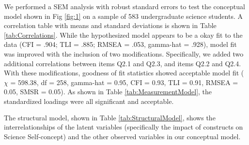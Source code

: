 \documentclass[smallextended]{svjour3}       %
\begin{document}
We performed a SEM analysis with robust standard errors to test the conceptual model shown in Fig \ref{fig:1} on a sample of 583 undergraduate science students. A correlation table with means and standard deviations is shown in Table \ref{tab:Correlations}. While the hypothesized model appears to be a okay fit to the data (CFI = .904; TLI = .885;  RMSEA = .053, gamma-hat =  .928), model fit was improved with the inclusion of two modifications. Specifically, we added two additional correlations between items Q2.1 and Q2.3, and items Q2.2 and Q2.4. With these modifications, goodness of fit statistics showed acceptable model fit \cite{hu1999cutoff,steiger2007understanding} ($\chi$ = 598.38, df = 258, gamma-hat = 0.95, CFI = 0.93, TLI = 0.91, RMSEA = 0.05, SMSR = 0.05). As shown in Table \ref{tab:MeasurementModel}, the standardized loadings were all significant and acceptable. 

The structural model, shown in Table \ref{tab:StructuralModel}, shows the interrelationships of the latent variables (specifically the impact of constructs on Science Self-concept) and the other observed variables in our conceptual model. 
\end{document}
